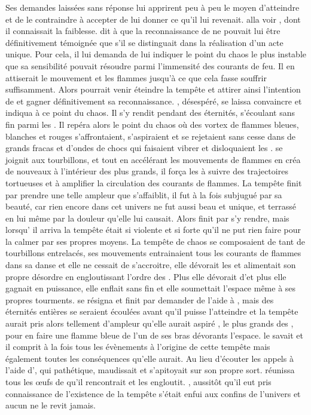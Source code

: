  
  Ses demandes laissées sans réponse lui apprirent peu à peu le moyen d'atteindre \Mey et de le contraindre à accepter de lui donner ce qu'il lui revenait. \Ogo alla voir \Esu, dont il connaissait la faiblesse. \Ogo dit à \Esu que la reconnaissance de \Mey ne pouvait lui être définitivement témoignée que s'il se distinguait dans la réalisation d'un acte unique. Pour cela, il lui demanda de lui indiquer le point du chaos le plus instable que sa sensibilité pouvait résoudre parmi l'immensité des courants de feu. Il en attiserait le mouvement et les flammes jusqu'à ce que cela fasse souffrir \Mey suffisamment. Alors \Esu pourrait venir éteindre la tempête et attirer ainsi l'intention de \Mey et gagner définitivement sa reconnaissance. \Esu, désespéré, se laissa convaincre et indiqua à \Ogo ce point du chaos. Il s'y rendit pendant des éternités, s'écoulant sans fin parmi les \SC. Il repéra alors le point du chaos où des vortex de flammes bleues, blanches et rouges s'affrontaient, s'aspiraient et se rejetaient sans cesse dans de grands fracas et d'ondes de chocs qui faisaient vibrer et disloquaient les \SC. \Ogo se joignit aux tourbillons, et tout en accélérant les mouvements de flammes en créa de nouveaux à l'intérieur des plus grands, il força les \SC à suivre des trajectoires tortueuses et à amplifier la circulation des courants de flammes. La tempête finit par prendre une telle ampleur que \Mey s'affaiblit, il fut à la fois subjugué par sa beauté, car rien encore dans cet univers ne fut aussi beau et unique, et terrassé en lui même par la douleur qu'elle lui causait. Alors \Esu finit par s'y rendre, mais lorsqu' il arriva la tempête était si violente et si forte qu'il ne put rien faire pour la calmer par ses propres moyens. La tempête de chaos se composaient de tant de tourbillons entrelacés, ses mouvements entrainaient tous les courants de flammes dans sa danse et elle ne cessait de s'accroitre, elle dévorait les \SC et alimentait son propre désordre en engloutissant l'ordre des \SC. Plus elle dévorait d'\SC et plus elle gagnait en puissance, elle enflait sans fin et elle soumettait l'espace même à ses propres tourments. \Esu se résigna et finit par demander de l'aide à \Boromu, mais des éternités entières se seraient écoulées avant qu'il puisse l'atteindre et la tempête aurait pris alors tellement d'ampleur qu'elle aurait aspiré \Boromu, le plus grands des \Dormus, pour en faire une flamme bleue de l'un de ses bras dévorants l'espace. \Boromu le savait et il comprit à la fois tous les évènements à l'origine de cette tempête mais également toutes les conséquences qu'elle aurait. Au lieu d'écouter les appels à l'aide d'\Esu, qui pathétique, maudissait \Ogo et s'apitoyait sur son propre sort. \Boromu réunissa tous les œufs de \Tot qu'il rencontrait et les engloutit. \Tot, aussitôt qu'il eut pris connaissance de l'existence de la tempête s'était enfui aux confins de l'univers et aucun \Dormus ne le revit jamais.      
   
